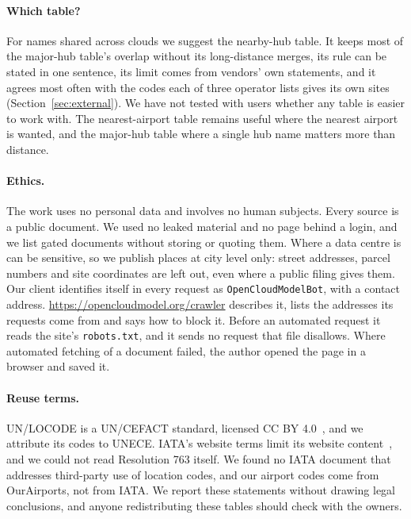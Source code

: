 \documentclass[10pt,twocolumn]{article}
\newcommand{\code}[1]{\texttt{#1}}
\begin{document}
\paragraph{Which table?} For names shared across clouds we suggest the nearby-hub table. It keeps most of the major-hub table's overlap without its long-distance merges, its rule can be stated in one sentence, its limit comes from vendors' own statements, and it agrees most often with the codes each of three operator lists gives its own sites (Section~\ref{sec:external}). We have not tested with users whether any table is easier to work with. The nearest-airport table remains useful where the nearest airport is wanted, and the major-hub table where a single hub name matters more than distance.

\paragraph{Ethics.} The work uses no personal data and involves no human subjects. Every source is a public document. We used no leaked material and no page behind a login, and we list gated documents without storing or quoting them. Where a data centre is can be sensitive, so we publish places at city level only: street addresses, parcel numbers and site coordinates are left out, even where a public filing gives them. Our client identifies itself in every request as \code{OpenCloudModelBot}, with a contact address. \url{https://opencloudmodel.org/crawler} describes it, lists the addresses its requests come from and says how to block it. Before an automated request it reads the site's \code{robots.txt}, and it sends no request that file disallows. Where automated fetching of a document failed, the author opened the page in a browser and saved it.

\paragraph{Reuse terms.} UN/LOCODE is a UN/CEFACT standard, licensed CC BY 4.0~\citep{unece_unlocode_terms}, and we attribute its codes to UNECE. IATA's website terms limit its website content~\citep{iata_terms_of_use}, and we could not read Resolution 763 itself. We found no IATA document that addresses third-party use of location codes, and our airport codes come from OurAirports, not from IATA. We report these statements without drawing legal conclusions, and anyone redistributing these tables should check with the owners.
\end{document}
